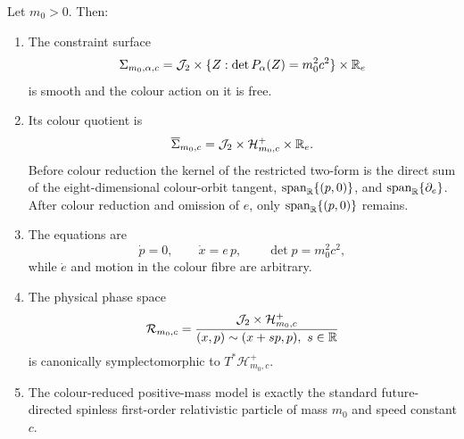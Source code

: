 \begin{theorem}
\label{wpr:thm:massive}
Let \(m_0>0\).  Then:
\begin{enumerate}[label=\textup{(\alph*)}]
\item The constraint surface
\[
 \Sigma_{m_0,\alpha,c}
 =\mathcal J_2\times\{Z:\det P_\alpha(Z)=m_0^2c^2\}\times\mathbb R_e
\]
is smooth and the colour action on it is free.
\item Its colour quotient is
\[
 \overline\Sigma_{m_0,c}
 =\mathcal J_2\times\mathcal H^+_{m_0,c}\times\mathbb R_e.
\]
Before colour reduction the kernel of the restricted two-form is the
direct sum of the eight-dimensional colour-orbit tangent,
\(\operatorname{span}_{\mathbb R}\{(p,0)\}\), and \(\operatorname{span}_{\mathbb R}\{\partial_e\}\).  After colour
reduction and omission of \(e\), only \(\operatorname{span}_{\mathbb R}\{(p,0)\}\) remains.
\item The equations are
\[
 \dot p=0,\qquad \dot x=e\,p,\qquad
 \det p=m_0^2c^2,
\]
while \(\dot e\) and motion in the colour fibre are arbitrary.
\item The physical phase space
\[
 \mathcal R_{m_0,c}
 =
 \frac{\mathcal J_2\times\mathcal H^+_{m_0,c}}
 {(x,p)\sim(x+s p,p),\ s\in\mathbb R}
\]
is canonically symplectomorphic to \(T^*\mathcal H^+_{m_0,c}\).
\item The colour-reduced positive-mass model is exactly the standard
future-directed spinless first-order relativistic particle of mass
\(m_0\) and speed constant \(c\).
\end{enumerate}
\end{theorem}
